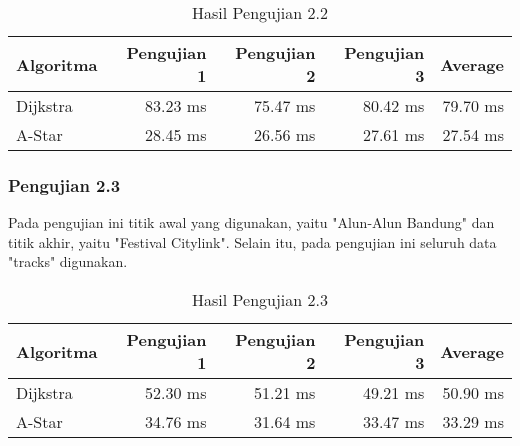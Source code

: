 \begin{table}[H]
\centering
\caption{Hasil Pengujian 2.2}
\label{tab:hasiluji2.2}
{\large
\begin{tabular}{|l|r|r|r|r|}
\hline
\textbf{Algoritma} & \textbf{Pengujian 1} & \textbf{Pengujian 2} & \textbf{Pengujian 3} & {\textbf{Average}}\\ \hline
Dijkstra           & 83.23 ms              & 75.47 ms             & 80.42 ms       &       79.70 ms       \\ \hline
A-Star            & 28.45 ms              & 26.56 ms              & 27.61 ms      &      27.54 ms       \\ \hline
\end{tabular}
}
\end{table}

\subsubsection{Pengujian 2.3}
Pada pengujian ini titik awal yang digunakan, yaitu "Alun-Alun Bandung" dan titik akhir, yaitu "Festival Citylink". Selain itu, pada pengujian ini seluruh data "tracks" digunakan.

\begin{table}[H]
\centering
\caption{Hasil Pengujian 2.3}
\label{tab:hasiluji2.3}
{\large
\begin{tabular}{|l|r|r|r|r|}
\hline
\textbf{Algoritma} & \textbf{Pengujian 1} & \textbf{Pengujian 2} & \textbf{Pengujian 3} & \multicolumn{1}{l|}{\textbf{Average}}\\ \hline
Dijkstra           & 52.30 ms              & 51.21 ms             & 49.21 ms      &     50.90 ms        \\ \hline
A-Star            & 34.76 ms              & 31.64 ms              & 33.47 ms      &     33.29 ms        \\ \hline
\end{tabular}
}
\end{table}

